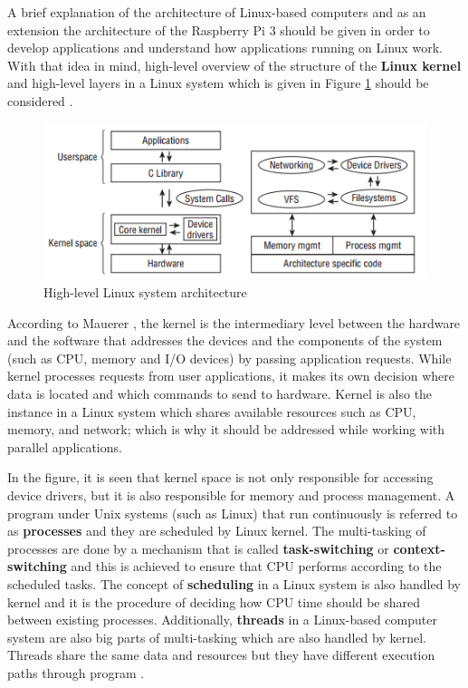 A brief explanation of the architecture of Linux-based computers and as an extension the architecture of the Raspberry Pi 3 should be given in order to develop applications and understand how applications running on Linux work. With that idea in mind, high-level overview of the structure of  the \textbf{Linux kernel} and high-level layers in a Linux system which is given in Figure \ref{fig:linuxarchitecture} should be considered \cite{linuxkernelbook}.
\begin{figure}[!ht]
	\centering
	\captionsetup{justification=centering}
	\includegraphics[scale=0.9]{content/images/linuxarchitecture.png}
	\caption{High-level Linux system architecture \cite{linuxkernelbook}}
	\label{fig:linuxarchitecture}
\end{figure}

According to Mauerer \cite{linuxkernelbook}, the kernel is the intermediary level between the hardware and the software that addresses the devices and the components of the system (such as CPU, memory and I/O devices) by passing application requests. While kernel processes requests from user applications, it makes its own decision where data is located and which commands to send to hardware. Kernel is also the instance in a Linux system which shares available resources such as CPU, memory, and network; which is why it should be addressed while working with parallel applications.

In the figure, it is seen that kernel space is not only responsible for accessing device drivers, but it is also responsible for memory and process management. A program under Unix systems (such as Linux) that run continuously is referred to as \textbf{processes} and they are scheduled by Linux kernel. The multi-tasking of processes are done by a mechanism that is called \textbf{task-switching} or \textbf{context-switching} and this is achieved to ensure that CPU performs according to the scheduled tasks. The concept of \textbf{scheduling} in a Linux system is also handled by kernel and it is the procedure of deciding how CPU time should be shared between existing processes. Additionally, \textbf{threads} in a Linux-based computer system are also big parts of multi-tasking which are also handled by kernel. Threads share the same data and resources but they have different execution paths through program \cite{linuxkernelbook}.

